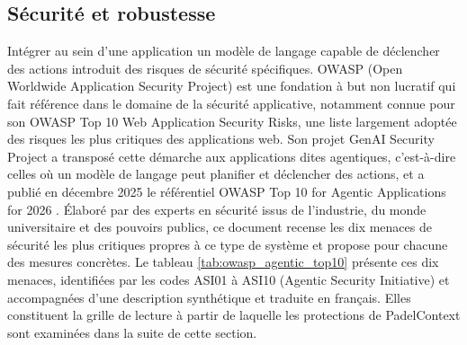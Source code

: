 \documentclass[12pt]{article}
\begin{document}
\subsection{Sécurité et robustesse}
Intégrer au sein d'une application un modèle de langage capable de déclencher des actions introduit des risques de sécurité spécifiques. OWASP (Open Worldwide Application Security Project) est une fondation à but non lucratif qui fait référence dans le domaine de la sécurité applicative, notamment connue pour son OWASP Top 10 Web Application Security Risks, une liste largement adoptée des risques les plus critiques des applications web. Son projet GenAI Security Project a transposé cette démarche aux applications dites agentiques, c'est-à-dire celles où un modèle de langage peut planifier et déclencher des actions, et a publié en décembre 2025 le référentiel OWASP Top 10 for Agentic Applications for 2026 \parencite{owasp_owasp_2025}. Élaboré par des experts en sécurité issus de l'industrie, du monde universitaire et des pouvoirs publics, ce document recense les dix menaces de sécurité les plus critiques propres à ce type de système et propose pour chacune des mesures concrètes.
\newline\newline
Le tableau \ref{tab:owasp_agentic_top10} présente ces dix menaces, identifiées par les codes ASI01 à ASI10 (Agentic Security Initiative) et accompagnées d'une description synthétique et traduite en français. Elles constituent la grille de lecture à partir de laquelle les protections de PadelContext sont examinées dans la suite de cette section.
\end{document}
